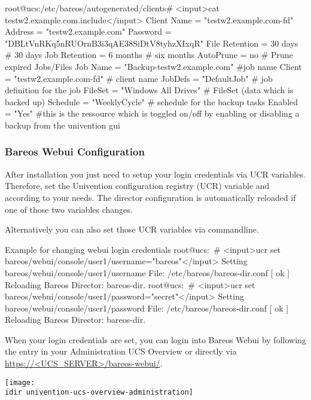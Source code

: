 \begin{commands}{}
root@ucs:/etc/bareos/autogenerated/clients# <input>cat testw2.example.com.include</input>
Client {
 Name = "testw2.example.com-fd"
 Address = "testw2.example.com"
 Password = "DBLtVnRKq5nRUOrnB3i3qAE38SiDtV8tyhzXIxqR"
 File Retention = 30 days # 30 days
 Job Retention = 6 months # six months
 AutoPrune = no # Prune expired Jobs/Files
}
Job {
 Name = "Backup-testw2.example.com" #job name
 Client = "testw2.example.com-fd" # client name
 JobDefs = "DefaultJob" # job definition for the job
 FileSet = "Windows All Drives" # FileSet (data which is backed up)
 Schedule = "WeeklyCycle" # schedule for the backup tasks
 Enabled = "Yes" #this is the ressource which is toggled on/off by enabling or disabling a backup from the univention gui
 }
\end{commands}

\subsubsection{Bareos Webui Configuration}

After installation you just need to setup your login credentials via UCR variables.
Therefore, set the Univention configuration registry (UCR) variable
 and
according to your needs. The director configuration is automatically reloaded if one of those two variables changes.


Alternatively you can also set those UCR variables via commandline.

\begin{commands}{Example for changing webui login credentials}
root@ucs:~# <input>ucr set bareos/webui/console/user1/username="bareos"</input>
Setting bareos/webui/console/user1/username
File: /etc/bareos/bareos-dir.conf
[ ok ] Reloading Bareos Director: bareos-dir.
root@ucs:~# <input>ucr set bareos/webui/console/user1/password="secret"</input>
Setting bareos/webui/console/user1/password
File: /etc/bareos/bareos-dir.conf
[ ok ] Reloading Bareos Director: bareos-dir.
\end{commands}

When your login credentials are set, you can login into Bareos Webui by following the entry in your Administration UCS Overview or directly via \url{https://<UCS_SERVER>/bareos-webui/}.

\begin{center}
  \texttt{[image: \\idir univention-ucs-overview-administration]}
\end{center}
